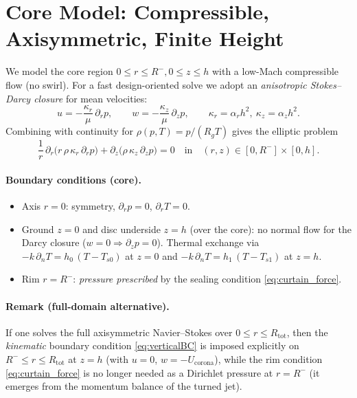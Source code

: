 \documentclass[11pt,a4paper]{article}
\begin{document}
\section{Core Model: Compressible, Axisymmetric, Finite Height}
We model the core region $0\le r\le R^-, 0\le z\le h$ with a low-Mach compressible flow (no swirl). For a fast design-oriented solve we adopt an \emph{anisotropic Stokes--Darcy closure} for mean velocities:
\begin{equation}
  u = -\frac{\kappa_r}{\mu}\,\partial_r p,\qquad
  w = -\frac{\kappa_z}{\mu}\,\partial_z p,
  \qquad \kappa_r=\alpha_r h^2,\ \kappa_z=\alpha_z h^2.
  \label{eq:darcy}
\end{equation}
Combining with continuity for $\rho(p,T)=p/(R_g T)$ gives the elliptic problem
\begin{equation}
  \frac{1}{r}\,\partial_r\!\big(r\,\rho\,\kappa_r\,\partial_r p\big)+\partial_z\!\big(\rho\,\kappa_z\,\partial_z p\big)=0
  \quad\text{in}\quad (r,z)\in[0,R^-]\times[0,h].
  \label{eq:elliptic}
\end{equation}

\paragraph{Boundary conditions (core).}
\begin{itemize}
  \item Axis $r=0$: symmetry, $\partial_r p=0$, $\partial_r T=0$.
  \item Ground $z=0$ and disc underside $z=h$ (over the core): no normal flow for the Darcy closure ($w=0\Rightarrow \partial_z p=0$). Thermal exchange via
  $-k\,\partial_n T=h_0\,(T-T_{s0})$ at $z=0$ and $-k\,\partial_n T=h_1\,(T-T_{s1})$ at $z=h$.
  \item Rim $r=R^-$: \emph{pressure prescribed} by the sealing condition \eqref{eq:curtain_force}.
\end{itemize}

\paragraph{Remark (full-domain alternative).}
If one solves the full axisymmetric Navier--Stokes over $0\le r\le R_{\text{tot}}$, then the \emph{kinematic} boundary condition \eqref{eq:verticalBC} is imposed explicitly on $R^-\le r\le R_{\text{tot}}$ at $z=h$ (with $u=0$, $w=-U_{\mathrm{corona}}$), while the rim condition \eqref{eq:curtain_force} is no longer needed as a Dirichlet pressure at $r=R^-$ (it emerges from the momentum balance of the turned jet).
\end{document}
